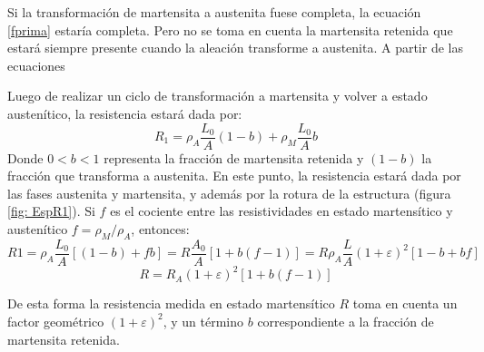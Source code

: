 \documentclass[a4paper,12pt,fleqn,twoside,openany]{book}
\begin{document}
  \hrulefill
  
 Si la transformación de martensita a austenita fuese completa, la ecuación \ref{fprima} estaría completa. Pero no se toma en cuenta la martensita retenida que estará siempre presente cuando la aleación transforme a austenita. A partir de las ecuaciones  
 
 
 Luego de realizar un ciclo de transformación a martensita y volver a estado austenítico, la resistencia estará dada por:
\begin{equation}
 R_1=\rho_A \frac{L_0}{A}(1-b) + \rho_M \frac{L_0}{A}b
\end{equation}
Donde $0<b<1$ representa la fracción de martensita retenida y $(1-b)$ la fracción que transforma a austenita. En este punto, la resistencia estará dada por las fases austenita y martensita, y además por la rotura de la estructura (figura \ref{fig: EspR1}). Si $f$ es el cociente entre las resistividades en estado martensítico y austenítico $f=\rho_M / \rho_ A$, entonces:
\begin{equation}
R1= \rho_A \frac{L_0}{A} [(1-b)+fb]=R \frac{A_0}{A}[1+b(f-1)] = R \rho_A \frac{L}{A} (1+\varepsilon)^2 [1-b+bf]
\end{equation}
\begin{equation}
 R = R_A (1+\varepsilon)^2 [1+b(f-1)]
\end{equation}

De esta forma la resistencia medida en estado martensítico $R$ toma en cuenta un factor geométrico  $(1+ \varepsilon)^2$, y un término $b$ correspondiente a la fracción de martensita retenida.


 
 
\vspace{5mm} %
 
 \hrulefill
 
\vspace{5mm} %
\end{document}
